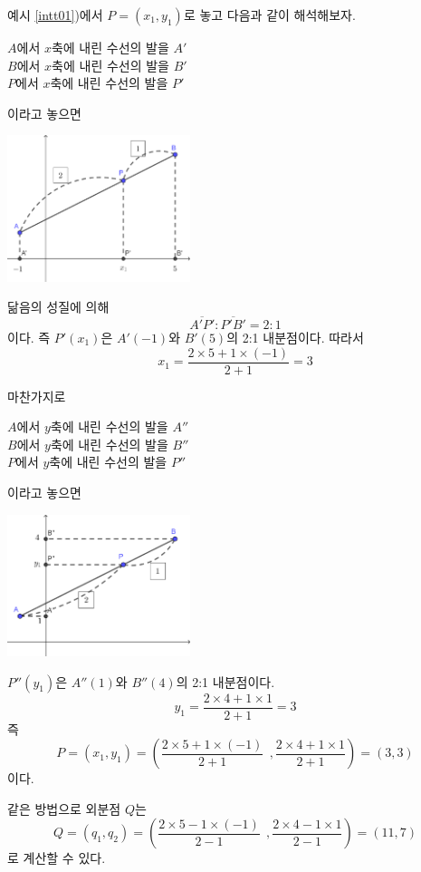 \documentclass{oblivoir}
\begin{document}
%
\exam{}\label{intt04}
예시 \ref{intt01})에서 \(P=(x_1,y_1)\)로 놓고 다음과 같이 해석해보자.
\par\medskip\noindent
\(A\)에서 \(x\)축에 내린 수선의 발을 \(A'\)\\
\(B\)에서 \(x\)축에 내린 수선의 발을 \(B'\)\\
\(P\)에서 \(x\)축에 내린 수선의 발을 \(P'\)
\par\medskip\noindent
이라고 놓으면
\begin{center}
\includegraphics[width=0.4\textwidth]{intt_04}
\end{center}
닮음의 성질에 의해
\[\overline{A'P'}:\overline{P'B'}=2:1\]
이다.
즉 \(P'(x_1)\)은 \(A'(-1)\)와 \(B'(5)\)의 2:1 내분점이다.
따라서
\[x_1=\frac{2\times5+1\times(-1)}{2+1}=3\]

마찬가지로
\par\medskip\noindent
\(A\)에서 \(y\)축에 내린 수선의 발을 \(A''\)\\
\(B\)에서 \(y\)축에 내린 수선의 발을 \(B''\)\\
\(P\)에서 \(y\)축에 내린 수선의 발을 \(P''\)
\par\medskip\noindent
이라고 놓으면
\begin{center}
\includegraphics[width=0.4\textwidth]{intt_05}
\end{center}
\(P''(y_1)\)은 \(A''(1)\)와 \(B''(4)\)의 2:1 내분점이다.
\[y_1=\frac{2\times4+1\times1}{2+1}=3\]
즉
\[P=(x_1,y_1)=\left(\frac{2\times5+1\times(-1)}{2+1}\:\:,\frac{2\times4+1\times1}{2+1}\right)=(3,3)\]
이다.

같은 방법으로 외분점 \(Q\)는
\[Q=(q_1,q_2)=\left(\frac{2\times5-1\times(-1)}{2-1}\:\:,\frac{2\times4-1\times1}{2-1}\right)=(11,7)\]
로 계산할 수 있다.
\end{document}
